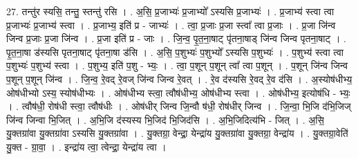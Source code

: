 \documentclass[17pt]{extarticle}
\begin{document}
27. तन्तु॑र स्यसि॒ तन्तु॒ स्तन्तु॑ रसि । . अ॒सि॒ प्र॒जाभ्यः॑ प्र॒जाभ्यो᳚ ऽस्यसि प्र॒जाभ्यः॑ । . प्र॒जाभ्य॑ स्त्वा त्वा प्र॒जाभ्यः॑ प्र॒जाभ्य॑ स्त्वा । . प्र॒जाभ्य॒ इति॑ प्र - जाभ्यः॑ । . त्वा॒ प्र॒जाः प्र॒जा स्त्वा᳚ त्वा प्र॒जाः । . प्र॒जा जि॑न्व जिन्व प्र॒जाः प्र॒जा जि॑न्व । . प्र॒जा इति॑ प्र - जाः । . जि॒न्व॒ पृ॒त॒ना॒षाट् पृ॑तना॒षाड् जि॑न्व जिन्व पृतना॒षाट् । . पृ॒त॒ना॒षा ड॑स्यसि पृतना॒षाट् पृ॑तना॒षा ड॑सि । . अ॒सि॒ प॒शुभ्यः॑ प॒शुभ्यो᳚ ऽस्यसि प॒शुभ्यः॑ । . प॒शुभ्य॑ स्त्वा त्वा प॒शुभ्यः॑ प॒शुभ्य॑ स्त्वा । . प॒शुभ्य॒ इति॑ प॒शु - भ्यः॒ । . त्वा॒ प॒शून् प॒शून् त्वा᳚ त्वा प॒शून् । . प॒शून् जि॑न्व जिन्व प॒शून् प॒शून् जि॑न्व । . जि॒न्व॒ रे॒वद् रे॒वज् जि॑न्व जिन्व रे॒वत् । . रे॒व द॑स्यसि रे॒वद् रे॒व द॑सि । . अ॒स्योष॑धीभ्य॒ ओष॑धीभ्यो ऽस्य॒ स्योष॑धीभ्यः । . ओष॑धीभ्य स्त्वा॒ त्वौष॑धीभ्य॒ ओष॑धीभ्य स्त्वा । . ओष॑धीभ्य॒ इत्योष॑धि - भ्यः॒ । . त्वौष॑धी॒ रोष॑धी स्त्वा॒ त्वौष॑धीः । . ओष॑धीर् जिन्व जि॒न्वौ ष॑धी॒ रोष॑धीर् जिन्व । . जि॒न्वा॒ भि॒जि द॑भि॒जिज् जि॑न्व जिन्वा भि॒जित् । . अ॒भि॒जि द॑स्यस्य भि॒जिद॑ भि॒जिद॑सि । . अ॒भि॒जिदित्य॑भि - जित् । . अ॒सि॒ यु॒क्तग्रा॑वा यु॒क्तग्रा॑वा ऽस्यसि यु॒क्तग्रा॑वा । . यु॒क्तग्रा॒ वेन्द्रा॒ येन्द्रा॑य यु॒क्तग्रा॑वा यु॒क्तग्रा॒ वेन्द्रा॑य । . यु॒क्तग्रा॒वेति॑ यु॒क्त - ग्रा॒वा॒ । . इन्द्रा॑य त्वा॒ त्वेन्द्रा॒ येन्द्रा॑य त्वा । \newline
\end{document}
